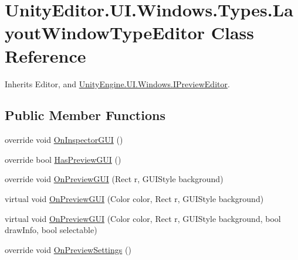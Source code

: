 \hypertarget{class_unity_editor_1_1_u_i_1_1_windows_1_1_types_1_1_layout_window_type_editor}{}\section{Unity\+Editor.\+U\+I.\+Windows.\+Types.\+Layout\+Window\+Type\+Editor Class Reference}
\label{class_unity_editor_1_1_u_i_1_1_windows_1_1_types_1_1_layout_window_type_editor}


Inherits Editor, and \hyperlink{interface_unity_engine_1_1_u_i_1_1_windows_1_1_i_preview_editor}{Unity\+Engine.\+U\+I.\+Windows.\+I\+Preview\+Editor}.

\subsection*{Public Member Functions}
\begin{DoxyCompactItemize}
\item 
override void \hyperlink{class_unity_editor_1_1_u_i_1_1_windows_1_1_types_1_1_layout_window_type_editor_aac65f8519b9d7a161ed324bd62be4c64}{On\+Inspector\+G\+U\+I} ()
\item 
override bool \hyperlink{class_unity_editor_1_1_u_i_1_1_windows_1_1_types_1_1_layout_window_type_editor_a44bfd8c854f2b09a05aa23de906d2e7a}{Has\+Preview\+G\+U\+I} ()
\item 
override void \hyperlink{class_unity_editor_1_1_u_i_1_1_windows_1_1_types_1_1_layout_window_type_editor_a7be553423104d1dab3de50717097537d}{On\+Preview\+G\+U\+I} (Rect r, G\+U\+I\+Style background)
\item 
virtual void \hyperlink{class_unity_editor_1_1_u_i_1_1_windows_1_1_types_1_1_layout_window_type_editor_a50718a97311340417bffc447d3c4e582}{On\+Preview\+G\+U\+I} (Color color, Rect r, G\+U\+I\+Style background)
\item 
virtual void \hyperlink{class_unity_editor_1_1_u_i_1_1_windows_1_1_types_1_1_layout_window_type_editor_a6d2af621124e80d6211b5752a8dc33d4}{On\+Preview\+G\+U\+I} (Color color, Rect r, G\+U\+I\+Style background, bool draw\+Info, bool selectable)
\item 
override void \hyperlink{class_unity_editor_1_1_u_i_1_1_windows_1_1_types_1_1_layout_window_type_editor_aecd659931eeaae3cfb34a16ff04e67e3}{On\+Preview\+Settings} ()
\end{DoxyCompactItemize}


